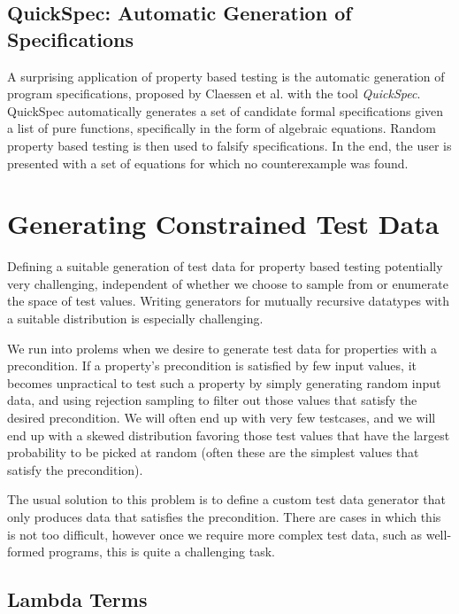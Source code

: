 \documentclass[a4paper,msc,twosized=semi]{uustthesis}
\begin{document}
\subsection{QuickSpec: Automatic Generation of Specifications}

  A surprising application of property based testing is the automatic generation of 
  program specifications, proposed by Claessen et al. \cite{claessen2010quickspec} 
  with the tool \textit{QuickSpec}. QuickSpec automatically generates a set of 
  candidate formal specifications given a list of pure functions, specifically in the 
  form of algebraic equations. Random property based testing is then used to falsify 
  specifications. In the end, the user is presented with a set of equations for which 
  no counterexample was found.  

\section{Generating Constrained Test Data}\label{genconstrainedtd}

  Defining a suitable generation of test data for property based testing potentially very challenging, independent of whether we choose to sample from 
  or enumerate the space of test values. Writing generators for mutually recursive 
  datatypes with a suitable distribution is especially challenging. 
    
  We run into prolems when we desire to generate test data for properties with a 
  precondition. If a property's precondition is satisfied by few input values, it 
  becomes unpractical to test such a property by simply generating random input data, 
  and using rejection sampling to filter out those values that satisfy the desired 
  precondition. We will often end up with very few testcases, and we will end up with 
  a skewed distribution favoring those test values that have the largest probability 
  to be picked at random (often these are the simplest values that satisfy the 
  precondition). 
  
  The usual solution to this problem is to define a custom test data generator that 
  only produces data that satisfies the precondition. There are cases in which this is 
  not too difficult, however once we require more complex test data, such as 
  well-formed programs, this is quite a challenging task. 

\subsection{Lambda Terms} 
\end{document}

